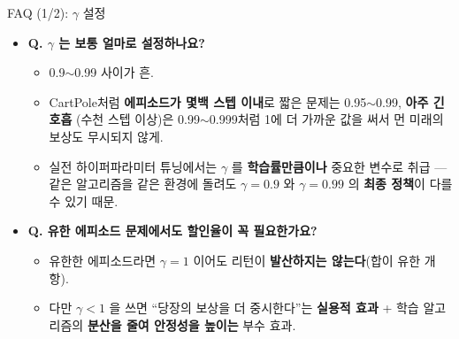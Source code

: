 \documentclass[aspectratio=169,11pt]{beamer}
\begin{document}
\begin{frame}{FAQ (1/2): $\gamma$ 설정}
  \begin{itemize}
    \item \textbf{Q. $\gamma$ 는 보통 얼마로 설정하나요?}
      \begin{itemize}
        \item 0.9$\sim$0.99 사이가 흔.
        \item CartPole처럼 \textbf{에피소드가 몇백 스텝 이내}로
          짧은 문제는 0.95$\sim$0.99, \textbf{아주 긴 호흡}
          (수천 스텝 이상)은 0.99$\sim$0.999처럼 1에 더 가까운
          값을 써서 먼 미래의 보상도 무시되지 않게.
        \item 실전 하이퍼파라미터 튜닝에서는 $\gamma$ 를
          \textbf{학습률만큼이나} 중요한 변수로 취급 --- 같은
          알고리즘을 같은 환경에 돌려도 $\gamma = 0.9$ 와
          $\gamma = 0.99$ 의 \textbf{최종 정책}이 다를 수
          있기 때문.
      \end{itemize}
    \item \textbf{Q. 유한 에피소드 문제에서도 할인율이 꼭
      필요한가요?}
      \begin{itemize}
        \item 유한한 에피소드라면 $\gamma = 1$ 이어도 리턴이
          \textbf{발산하지는 않는다}(합이 유한 개 항).
        \item 다만 $\gamma < 1$ 을 쓰면 ``당장의 보상을 더
          중시한다''는 \textbf{실용적 효과} + 학습 알고리즘의
          \textbf{분산을 줄여 안정성을 높이는} 부수 효과.
      \end{itemize}
  \end{itemize}
\end{frame}
\end{document}
